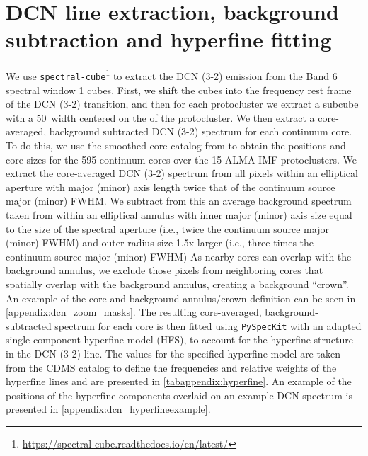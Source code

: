 
\section{DCN line extraction, background subtraction and hyperfine fitting}
\label{appendix:dcn_fitting}

 
We use \texttt{spectral-cube}\footnote{\url{https://spectral-cube.readthedocs.io/en/latest/}} \citep{Ginsburg2019b} to extract the DCN (3-2) emission from the Band 6 spectral window 1 cubes. First, we shift the cubes into the  frequency rest frame of the DCN (3-2) transition, and then for each protocluster we extract a subcube with a 50~\kms width centered on the \vlsr of the protocluster. We then extract a core-averaged, background subtracted DCN (3-2) spectrum for each continuum core. To do this, we use the smoothed core catalog from \citet{louvet22} to obtain the positions and core sizes for the 595 continuum cores over the 15 ALMA-IMF protoclusters. We extract the core-averaged DCN (3-2) spectrum from all pixels within an elliptical aperture with major (minor) axis length twice that of the continuum source major (minor) FWHM. We subtract from this an average background spectrum taken from within an elliptical annulus with inner major (minor) axis size equal to the size of the spectral aperture (i.e., twice the continuum source major (minor) FWHM) and outer radius size 1.5x larger (i.e., three times the continuum source major (minor) FWHM)  %
As nearby cores can overlap with the background annulus, we exclude those pixels from neighboring cores that spatially overlap with the background annulus, creating a background ``crown''. An example of the core and background annulus/crown definition can be seen in \cref{appendix:dcn_zoom_masks}.  
The resulting core-averaged, background-subtracted spectrum for each core is then fitted using \texttt{PySpecKit} \citep{Ginsburg2011} with an adapted single component hyperfine model (HFS), to account for the hyperfine structure in the DCN (3-2) line. The values for the specified hyperfine model are taken from the CDMS catalog to define the frequencies and relative weights of the hyperfine lines \citep{Endres2016,muller2001,muller2005} and are presented in \cref{tabappendix:hyperfine}. An example of the positions of the hyperfine components overlaid on an example DCN spectrum is presented in \cref{appendix:dcn_hyperfineexample}.
\label{sec:hyperfinemodel}

